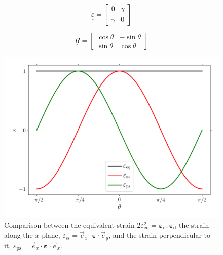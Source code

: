 \documentclass[times,namecite]{goose-article}
\begin{document}
\begin{equation}
  \underline{\underline{\varepsilon}}
  =
  \begin{bmatrix}
    0      & \gamma \\
    \gamma & 0
  \end{bmatrix}
\end{equation}

\begin{equation}
  \underline{\underline{R}}
  =
  \begin{bmatrix}
    \cos \theta & - \sin \theta \\
    \sin \theta &   \cos \theta
  \end{bmatrix}
\end{equation}

\begin{figure}[htp]
  \centering
  \includegraphics[width=.5\textwidth]{figures/epseq_2d}
  \caption{Comparison between the equivalent strain $2 \varepsilon_\mathrm{eq}^2 = \bm{\varepsilon}_\mathrm{d} : \bm{\varepsilon}_\mathrm{d}$ the strain along the $x$-plane, $\varepsilon_\mathrm{ss} = \vec{e}_x \cdot \bm{\varepsilon} \cdot \vec{e}_y$, and the strain perpendicular to it, $\varepsilon_\mathrm{ps} = \vec{e}_x \cdot \bm{\varepsilon} \cdot \vec{e}_x$.}
  \label{fig:}
\end{figure}


\end{document}
